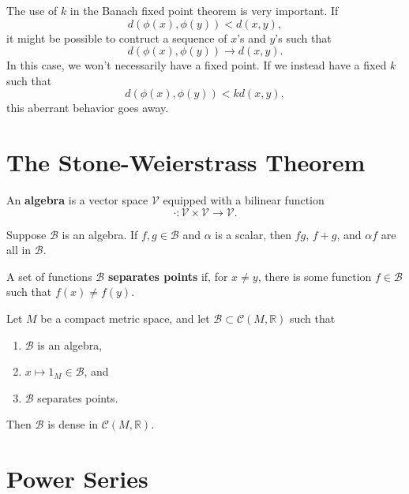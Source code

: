 \documentclass[twoside,10pt]{report}
\begin{document}
\begin{note}{}{}
	The use of $ k$ in the Banach fixed point theorem is very important. If
	\[
		d(\phi(x), \phi(y)) < d(x,y),
	\] it might be possible to contruct a sequence of $x$'s and $y$'s such that
	\[
		d(\phi(x), \phi(y)) \to d(x,y).
	\] In this case, we won't necessarily have a fixed point. If we instead have a fixed $k$ such that
	\[
	d(\phi(x), \phi(y)) < k d(x,y),
	\] this aberrant behavior goes away.
\end{note}



\section{The Stone-Weierstrass Theorem}

\begin{defn}[]
An \textbf{algebra} is a vector space $\mathcal{V}$ equipped with a bilinear function \[\cdot : \mathcal{V} \times \mathcal{V} \to \mathcal{V}.\]
\end{defn}

Suppose $\mathcal{B}$ is an algebra. If $f,g \in \mathcal{B}$ and $\alpha$ is a scalar, then $fg$, $f+g$, and $\alpha f$ are all in $\mathcal{B}$.

\begin{defn}[]
	A set of functions $\mathcal{B}$ \textbf{separates points} if, for $x \neq y$, there is some function $f \in \mathcal{B}$ such that $f(x) \neq f(y)$.
\end{defn}

\begin{thrm}
	Let $M$ be a compact metric space, and let $\mathcal{B} \subset \mathcal{C}(M, \mathbb{R})$ such that
	\begin{enumerate}
		\item $\mathcal{B}$ is an algebra,
		\item $x \mapsto 1_M \in \mathcal{B}$, and
		\item $\mathcal{B}$ separates points.
	\end{enumerate}
	Then $\mathcal{B}$ is dense in $\mathcal{C}(M, \mathbb{R})$.
\end{thrm}


\section{Power Series}
\end{document}
